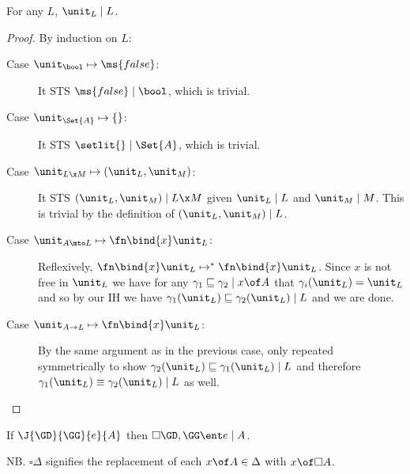 \documentclass{article}
\newcommand{\ale}{\sqsubseteq}
\newcommand{\aeq}{\equiv}
\newcommand{\step}{\mapsto}
\newcommand{\steps}{\step^*}
\newcommand{\disc}[1]{\square{#1}}
\newcommand{\lr}[2]{#2\mathrel{|}#1}
\newcommand{\lrcx}[3]{#1 \ent \lr{#2}{#3}}
\begin{document}
\begin{lemma}\label{lem:lr-unit}
  For any $L$, $\lr{L}{\unit_L}$.
\end{lemma}
\begin{proof}
  By induction on $L$:
  \begin{description}
  \item[Case $\unit_\bool \step \ms{false}$:] It STS $\lr{\bool}{\ms{false}}$,
    which is trivial.
  \item[Case $\unit_{\Set{A}} \step \{\}$:] It STS $\lr{\Set{A}}{\setlit{}}$,
    which is trivial.
  \item[Case $\unit_{L \x M} \step (\unit_L, \unit_M)$:] It STS $\lr{L \x
    M}{(\unit_L, \unit_M)}$ given $\lr{L}{\unit_L}$ and $\lr{M}{\unit_M}$. This
    is trivial by the definition of $\lr{L}{(\unit_L, \unit_M)}$.
  \item[Case $\unit_{A \mto L} \step \fn\bind{x} \unit_L$:] Reflexively,
    $\fn\bind{x}\unit_L \steps \fn\bind{x} \unit_L$. Since $x$ is not free in
    $\unit_L$ we have for any $\lr{x\of A}{\gamma_1 \ale \gamma_2}$ that
    $\gamma_i(\unit_L) = \unit_L$ and so by our IH we have
    $\lr{L}{\gamma_1(\unit_L) \ale \gamma_2(\unit_L)}$ and we are done.

  \item[Case $\unit_{A \uto L} \step \fn\bind{x} \unit_L$:] By the same argument
    as in the previous case, only repeated symmetrically to show
    $\lr{L}{\gamma_2(\unit_L) \ale \gamma_1(\unit_L)}$ and therefore
    $\lr{L}{\gamma_1(\unit_L) \aeq \gamma_2(\unit_L)}$ as well.
  \end{description}
\end{proof}


\newcommand{\cxdisc}[1]{\disc{#1}}

\begin{theorem}
  If $\J{\GD}{\GG}{e}{A}$ then $\lrcx{\cxdisc{\GD},\GG}{A}{e}$.
\end{theorem}

NB. $\cxdisc{\Delta}$ signifies the replacement of each $x \of A \in \Delta$
with $x \of \disc{A}$.
\end{document}
